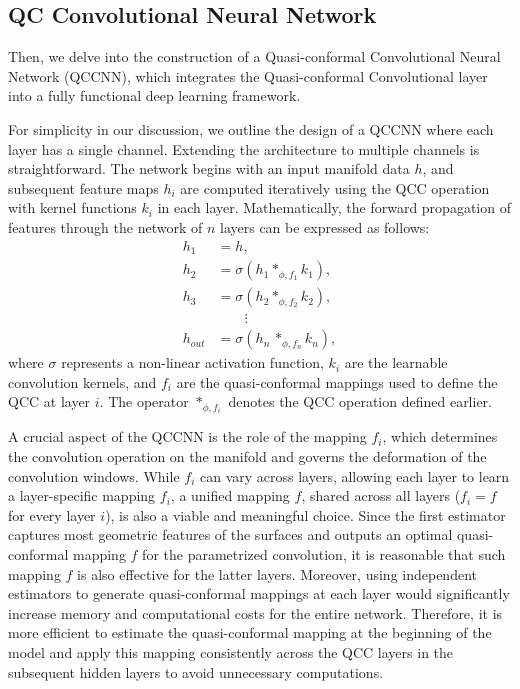 \subsection{QC Convolutional Neural Network}
\label{QCCNN}


Then, we delve into the construction of a Quasi-conformal Convolutional Neural Network (QCCNN), which integrates the Quasi-conformal Convolutional layer into a fully functional deep learning framework.

For simplicity in our discussion, we outline the design of a QCCNN where each layer has a single channel. Extending the architecture to multiple channels is straightforward. The network begins with an input manifold data $ h $, and subsequent feature maps $ h_i $ are computed iteratively using the QCC operation with kernel functions $k_i$ in each layer. Mathematically, the forward propagation of features through the network of $n$ layers can be expressed as follows:
\begin{equation}
\begin{aligned}
    h_1\, &= h,\\
    h_2\, &= \sigma(h_1 \ast_{\phi, f_1} k_1),\\
    h_3\, &= \sigma(h_2 \ast_{\phi, f_2} k_2),\\
    &\qquad \vdots\\    
    h_{out} &= \sigma(h_{n} \,\ast_{\phi, f_{n}} k_{n}),
\label{eq:formulationQCCNNmulti}
\end{aligned}
\end{equation}
where $ \sigma $ represents a non-linear activation function, $ k_i $ are the learnable convolution kernels, and $ f_i $ are the quasi-conformal mappings used to define the QCC at layer $ i $. The operator $ \ast_{\phi, f_i} $ denotes the QCC operation defined earlier.


A crucial aspect of the QCCNN is the role of the mapping $ f_i $, which determines the convolution operation on the manifold and governs the deformation of the convolution windows. While $ f_i $ can vary across layers, allowing each layer to learn a layer-specific mapping $ f_i $, a unified mapping $ f $, shared across all layers ($ f_i = f $ for every layer $ i $), is also a viable and meaningful choice. 
Since the first estimator captures most geometric features of the surfaces and outputs an optimal quasi-conformal mapping $f$ for the parametrized convolution, it is reasonable that such mapping $f$ is also effective for the latter layers. Moreover, using independent estimators to generate quasi-conformal mappings at each layer would significantly increase memory and computational costs for the entire network. Therefore, it is more efficient to estimate the quasi-conformal mapping at the beginning of the model and apply this mapping consistently across the QCC layers in the subsequent hidden layers to avoid unnecessary computations.

